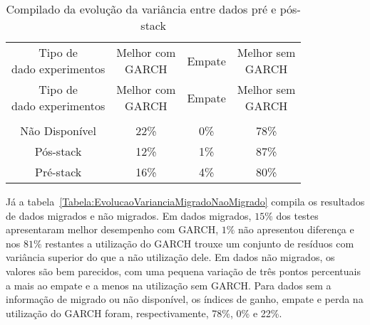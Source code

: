 \begin{center}
\begin{longtable}{cccc}
\toprule
\rowcolor{white}
\caption{Compilado da evolução da variância entre dados pré e pós-stack}
\label{Tabela:EvolucaoVarianciaPrePosStack} \\
\midrule
\rowcolor{white}
   \specialcell{Tipo de\\dado experimentos} & \specialcell{Melhor com\\GARCH} &
   Empate & \specialcell{Melhor sem\\GARCH} \\
\midrule
\endfirsthead
\midrule
\rowcolor{white}
   \specialcell{Tipo de\\dado experimentos} & \specialcell{Melhor com\\GARCH} &
   Empate & \specialcell{Melhor sem\\GARCH} \\
\toprule
\endhead
\midrule \\ %
\endfoot
\bottomrule
\endlastfoot
    Não Disponível   & 22\%  & 0\%   & 78\% \\
    Pós-stack & 12\%  & 1\%   & 87\% \\
    Pré-stack & 16\%  & 4\%   & 80\% \\
\end{longtable}
\end{center}

Já a tabela~\ref{Tabela:EvolucaoVarianciaMigradoNaoMigrado} compila os
resultados de dados migrados e não migrados. Em dados migrados, $15\%$ dos
testes apresentaram melhor desempenho com GARCH, $1\%$ não apresentou
diferença e nos $81\%$ restantes a utilização do GARCH trouxe um conjunto de
resíduos com variância superior do que a não utilização dele. Em dados não
migrados, os valores são bem parecidos, com uma pequena variação de três pontos
percentuais a mais ao empate e a menos na utilização sem GARCH. Para dados sem a
informação de migrado ou não disponível, os índices de ganho, empate e perda na utilização do GARCH
foram, respectivamente, 78\%, 0\% e 22\%.

